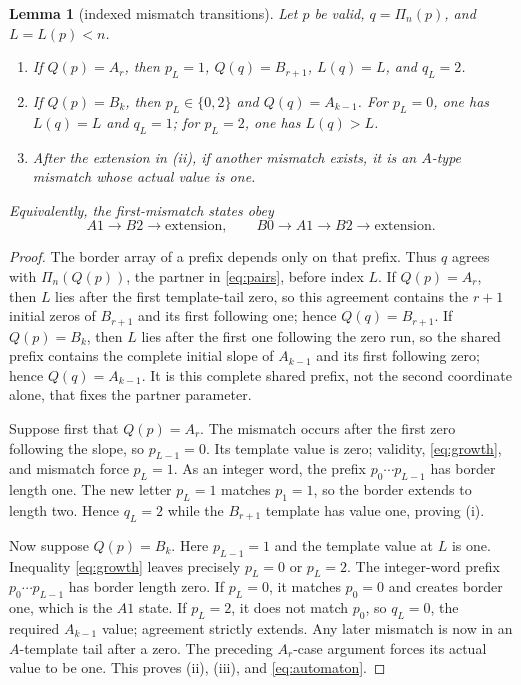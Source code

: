 \documentclass[10pt,a4paper]{amsart}
\newtheorem{lemma}[theorem]{Lemma}
\theoremstyle{definition}
\theoremstyle{remark}
\begin{document}
\begin{lemma}[indexed mismatch transitions]\label{lem:mismatch}
Let $p$ be valid, $q=\Pi_n(p)$, and $L=L(p)<n$.
\begin{enumerate}[label=(\roman*)]
\item If $Q(p)=A_r$, then $p_L=1$, $Q(q)=B_{r+1}$,
      $L(q)=L$, and $q_L=2$.
\item If $Q(p)=B_k$, then $p_L\in\{0,2\}$ and $Q(q)=A_{k-1}$.
      For $p_L=0$, one has $L(q)=L$ and $q_L=1$; for $p_L=2$,
      one has $L(q)>L$.
\item After the extension in (ii), if another mismatch exists, it is an
      $A$-type mismatch whose actual value is one.
\end{enumerate}
Equivalently, the first-mismatch states obey
\begin{equation}
 A1\longrightarrow B2\longrightarrow\text{extension},\qquad
 B0\longrightarrow A1\longrightarrow B2\longrightarrow\text{extension}.
                                                               \label{eq:automaton}
\end{equation}
\end{lemma}

\begin{proof}
The border array of a prefix depends only on that prefix.  Thus $q$ agrees
with $\Pi_n(Q(p))$, the partner in \eqref{eq:pairs}, before index $L$.
If $Q(p)=A_r$, then $L$ lies after the first template-tail zero, so this
agreement contains the $r+1$ initial zeros of $B_{r+1}$ and its first
following one; hence $Q(q)=B_{r+1}$.  If $Q(p)=B_k$, then $L$ lies after the
first one following the zero run, so the shared prefix contains the complete
initial slope of $A_{k-1}$ and its first following zero; hence
$Q(q)=A_{k-1}$.  It is this complete shared prefix, not the second coordinate
alone, that fixes the partner parameter.

Suppose first that $Q(p)=A_r$.  The mismatch occurs after the first zero
following the slope, so $p_{L-1}=0$.  Its template value is zero; validity,
\eqref{eq:growth}, and mismatch force $p_L=1$.  As an integer word, the
prefix $p_0\cdots p_{L-1}$ has border length one.  The new letter $p_L=1$
matches $p_1=1$, so the border extends to length two.  Hence $q_L=2$ while
the $B_{r+1}$ template has value one, proving (i).

Now suppose $Q(p)=B_k$.  Here $p_{L-1}=1$ and the template value at $L$ is
one.  Inequality \eqref{eq:growth} leaves precisely $p_L=0$ or $p_L=2$.
The integer-word prefix $p_0\cdots p_{L-1}$ has border length zero.  If
$p_L=0$, it matches $p_0=0$ and creates border one, which is the $A1$ state.
If $p_L=2$, it does not match $p_0$, so $q_L=0$, the required $A_{k-1}$
value; agreement strictly extends.  Any later mismatch is now in an
$A$-template tail after a zero.  The preceding $A_r$-case argument forces its
actual value to be one.  This proves (ii), (iii), and \eqref{eq:automaton}.
\end{proof}
\end{document}
